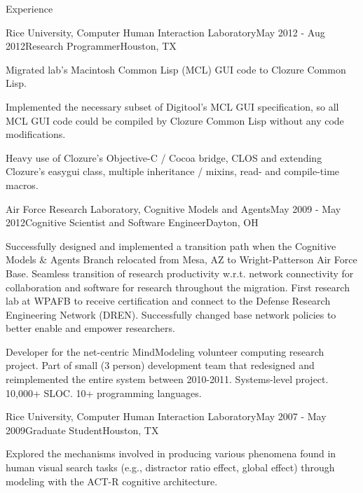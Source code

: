 
\begin{rSection}{Experience}

\begin{rSubsection}{Rice University, Computer Human Interaction Laboratory}{May 2012 - Aug 2012}{Research Programmer}{Houston, TX}
\item Migrated lab's Macintosh Common Lisp (MCL) GUI code to Clozure Common Lisp. 
\item Implemented the necessary subset of Digitool's MCL GUI specification, so all MCL GUI code could be compiled by Clozure Common Lisp without any code modifications.
\item Heavy use of Clozure's Objective-C / Cocoa bridge, CLOS and extending Clozure's easygui class, multiple inheritance / mixins, read- and compile-time macros.
\end{rSubsection}

\begin{rSubsection}{Air Force Research Laboratory, Cognitive Models and Agents}{May 2009 - May 2012}{Cognitive Scientist and Software Engineer}{Dayton, OH}
\item Successfully designed and implemented a transition path when the Cognitive Models \& Agents Branch relocated from Mesa, AZ to Wright-Patterson Air Force Base. 
Seamless transition of research productivity w.r.t. network connectivity for collaboration and software for research throughout the migration.
First research lab at WPAFB to receive certification and connect to the Defense Research Engineering Network (DREN).
Successfully changed base network policies to better enable and empower researchers.
\end{rSubsection}
\item Developer for the net-centric MindModeling volunteer computing research project.
Part of small (3 person) development team that redesigned and reimplemented the entire system between 2010-2011.
Systems-level project. 10,000+ SLOC. 10+ programming languages.

\begin{rSubsection}{Rice University, Computer Human Interaction Laboratory}{May 2007 - May 2009}{Graduate Student}{Houston, TX}
\item Explored the mechanisms involved in producing various phenomena found in human visual search tasks
(e.g., distractor ratio effect, global effect) through modeling with the ACT-R cognitive architecture. 
\end{rSubsection}


\end{rSection}
